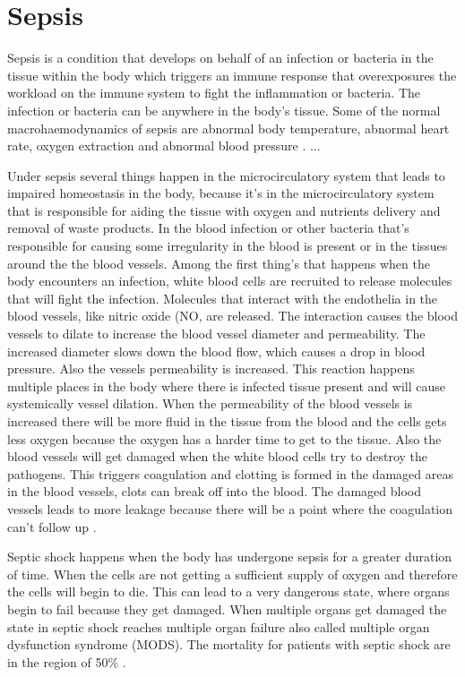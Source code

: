 \section{Sepsis}

Sepsis is a condition that develops on behalf of an infection or bacteria in the tissue within the body which triggers an immune response that overexposures the workload on the immune system to fight the inflammation or bacteria. The infection or bacteria can be anywhere in the body’s tissue. Some of the normal macrohaemodynamics of sepsis are abnormal body temperature, abnormal heart rate, oxygen extraction and abnormal blood pressure \citep{plunta2010}.
...

Under sepsis several things happen in the microcirculatory system that leads to impaired homeostasis in the body, because it’s in the microcirculatory system that is responsible for aiding the tissue with oxygen and nutrients delivery and removal of waste products. In the blood infection or other bacteria that’s responsible for causing some irregularity in the blood is present or in the tissues around the the blood vessels. Among the first thing’s that happens when the body encounters an infection, white blood cells are recruited to release molecules that will fight the infection. Molecules that interact with the endothelia in the blood vessels, like nitric oxide (NO, are released. The interaction causes the blood vessels to dilate to increase the blood vessel diameter and permeability. The increased diameter slows down the blood flow, which causes a drop in blood pressure. Also the vessels permeability is increased. This reaction happens multiple places in the body where there is infected tissue present and will cause systemically vessel dilation.
When the permeability of the blood vessels is increased there will be more fluid in the tissue from the blood and the cells gets less oxygen because the oxygen has a harder time to get to the tissue. Also the blood vessels will get damaged when the white blood cells try to destroy the pathogens. This triggers coagulation and clotting is formed in the damaged areas in the blood vessels, clots can break off into the blood. The damaged blood vessels leads to more leakage because there will be a point where the coagulation can’t follow up \citep{baudouin200}.

Septic shock happens when the body has undergone sepsis for a greater duration of time. When the cells are not getting a sufficient supply of oxygen and therefore the cells will begin to die. This can lead to a very dangerous state, where organs begin to fail because they get damaged. When multiple organs get damaged the state in septic shock reaches multiple organ failure also called multiple organ dysfunction syndrome (MODS). The mortality for patients with septic shock are in the region of 50\% \citep{baudouin200}. 


